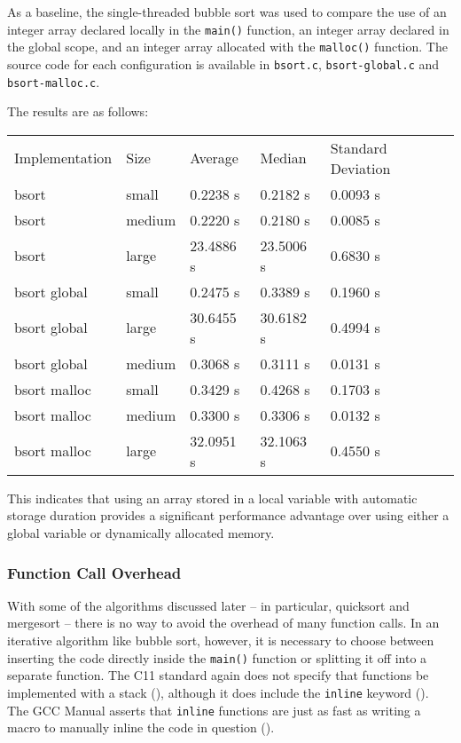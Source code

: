 \documentclass{article}
\begin{document}
As a baseline, the single-threaded bubble sort was used to compare the
use of an integer array declared locally in the \texttt{main()}
function, an integer array declared in the global scope, and an
integer array allocated with the \texttt{malloc()} function. The
source code for each configuration is available in \texttt{bsort.c},
\texttt{bsort-global.c} and \texttt{bsort-malloc.c}. \bigskip

The results are as follows:
\begin{center}
\begin{tabular}{lllll}
 Implementation  &  Size & Average  &  Median     &  Standard Deviation             \\
 bsort           &  small    &  0.2238 s   &  0.2182 s            &  0.0093 s  \\
 bsort           &  medium   &  0.2220 s   &  0.2180 s            &  0.0085 s  \\
 bsort           &  large    &  23.4886 s  &  23.5006 s           &  0.6830 s  \\
 bsort global    &  small    &  0.2475 s   &  0.3389 s            &
 0.1960 s  \\
bsort global    &  large    &  30.6455 s  &  30.6182 s           &  0.4994 s  \\
 bsort global    &  medium   &  0.3068 s   &  0.3111 s            &  0.0131 s  \\
 bsort malloc    &  small    &  0.3429 s   &  0.4268 s            &  0.1703 s  \\
 bsort malloc    &  medium   &  0.3300 s   &  0.3306 s            &
 0.0132 s  \\
bsort malloc    &  large    &  32.0951 s  &  32.1063 s           &  0.4550 s  \\
\end{tabular}
\end{center}\bigskip

This indicates that using an array stored in a local variable with automatic storage
duration provides a significant performance advantage over using
either a global variable or dynamically allocated memory.

\subsubsection{Function Call Overhead}
With some of the algorithms discussed later -- in particular,
quicksort and mergesort -- there is no way to avoid the overhead of
many function calls. In an iterative algorithm like bubble sort,
however, it is necessary to choose between inserting the code directly inside
the \texttt{main()} function or splitting it off into a separate
function. The C11 standard again does not specify that functions be
implemented with a stack (\cite[\S 6.7.6.3]{CStd}), although it does
include the \texttt{inline} keyword (\cite[\S 6.4.1, \S
6.7.4]{CStd}). The GCC Manual asserts that \texttt{inline} functions
are just as fast as writing a macro to manually inline the code in
question (\cite[\S 6.39]{GCCMan}).
\end{document}
